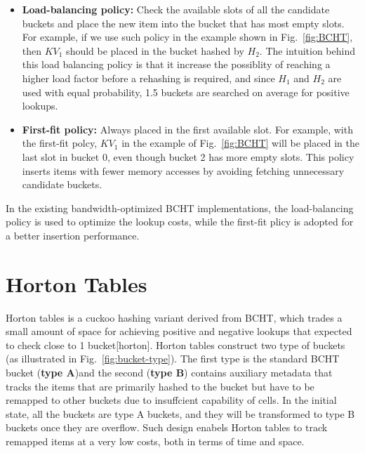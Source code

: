 \documentclass[12pt,conference,compsoc]{IEEEtran}
\begin{document}
\begin{itemize}
    \item \textbf{Load-balancing policy:} Check the available slots of all the candidate buckets and place the new item into the bucket that has most empty slots. For example, if we use such policy in the example shown in Fig.~\ref{fig:BCHT}, then $KV_1$ should be placed in the bucket hashed by $H_2$. The intuition behind this load balancing policy is that it increase the possiblity of reaching a higher load factor before a rehashing is required, and since $H_1$ and $H_2$ are used with equal probability, 1.5 buckets are searched on average for positive lookups.
    \item \textbf{First-fit policy:} Always placed in the first available slot. For example, with the first-fit polcy, $KV_1$ in the example of Fig.~\ref{fig:BCHT} will be placed in the last slot in bucket 0, even though bucket 2 has more empty slots. This policy inserts items with fewer memory accesses by avoiding fetching unnecessary candidate buckets.
\end{itemize}

In the existing bandwidth-optimized BCHT implementations, the load-balancing policy is used to optimize the lookup costs, while the first-fit plicy is adopted for a better insertion performance.

\section{Horton Tables}
\label{sec:horton}
Horton tables is a cuckoo hashing variant derived from BCHT, which trades a small amount of space for achieving positive and negative lookups that expected to check close to 1 bucket[horton]. Horton tables construct two type of buckets (as illustrated in Fig.~\ref{fig:bucket-type}). The first type is the standard BCHT bucket (\textbf{type A})and the second (\textbf{type B}) contains auxiliary metadata that tracks the items that are primarily hashed to the bucket but have to be remapped to other buckets due to insuffcient capability of cells. In the initial state, all the buckets are type A buckets, and they will be transformed to type B buckets once they are overflow. Such design enabels Horton tables to track remapped items at a very low costs, both in terms of time and space.
\end{document}
